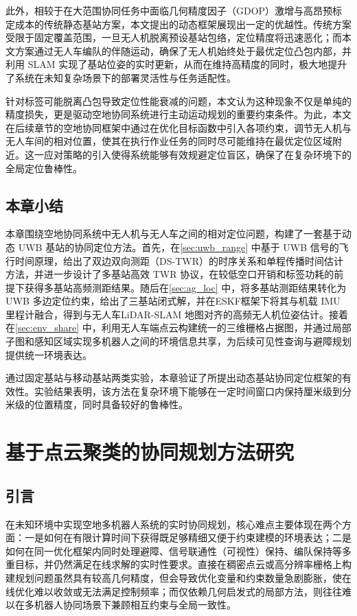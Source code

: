 此外，相较于在大范围协同任务中面临几何精度因子（GDOP）激增与高昂预标定成本的传统静态基站方案，本文提出的动态框架展现出一定的优越性。传统方案受限于固定覆盖范围，一旦无人机脱离预设基站包络，定位精度将迅速恶化；而本文方案通过无人车编队的伴随运动，确保了无人机始终处于最优定位凸包内部，并利用 SLAM 实现了基站位姿的实时更新，从而在维持高精度的同时，极大地提升了系统在未知复杂场景下的部署灵活性与任务适配性。

针对标签可能脱离凸包导致定位性能衰减的问题，本文认为这种现象不仅是单纯的精度损失，更是驱动空地协同系统进行主动运动规划的重要约束条件。为此，本文在后续章节的空地协同框架中通过在优化目标函数中引入各项约束，调节无人机与无人车间的相对位置，使其在执行作业任务的同时尽可能维持在最优定位区域附近。这一应对策略的引入使得系统能够有效规避定位盲区，确保了在复杂环境下的全局定位鲁棒性。

\section{本章小结}
\label{sec:summary_loc}

本章围绕空地协同系统中无人机与无人车之间的相对定位问题，构建了一套基于动态 UWB 基站的协同定位方法。首先，在\autoref{sec:uwb_range} 中基于 UWB 信号的飞行时间原理，给出了双边双向测距（DS-TWR）的时序关系和单程传播时间估计方法，并进一步设计了多基站高效 TWR 协议，在较低空口开销和标签功耗的前提下获得多基站高频测距结果。随后在\autoref{sec:ag_loc} 中，将多基站测距结果转化为 UWB 多边定位约束，给出了三基站闭式解，并在ESKF框架下将其与机载 IMU 里程计融合，得到与无人车LiDAR-SLAM 地图对齐的高频无人机位姿估计。接着在\autoref{sec:env_share} 中，利用无人车端点云构建统一的三维栅格占据图，并通过局部子图和感知区域实现多机器人之间的环境信息共享，为后续可见性查询与避障规划提供统一环境表达。

通过固定基站与移动基站两类实验，本章验证了所提出动态基站协同定位框架的有效性。实验结果表明，该方法在复杂环境下能够在一定时间窗口内保持厘米级到分米级的位置精度，同时具备较好的鲁棒性。


\chapter{基于点云聚类的协同规划方法研究}

\section{引言}

在未知环境中实现空地多机器人系统的实时协同规划，核心难点主要体现在两个方面：一是如何在有限计算时间下获得既足够精细又便于约束建模的环境表达；二是如何在同一优化框架内同时处理避障、信号联通性（可视性）保持、编队保持等多重目标，并仍然满足在线求解的实时性要求。直接在稠密点云或高分辨率栅格上构建规划问题虽然具有较高几何精度，但会导致优化变量和约束数量急剧膨胀，使在线优化难以收敛或无法满足控制频率；而仅依赖几何启发式的局部方法，则往往难以在多机器人协同场景下兼顾相互约束与全局一致性。

